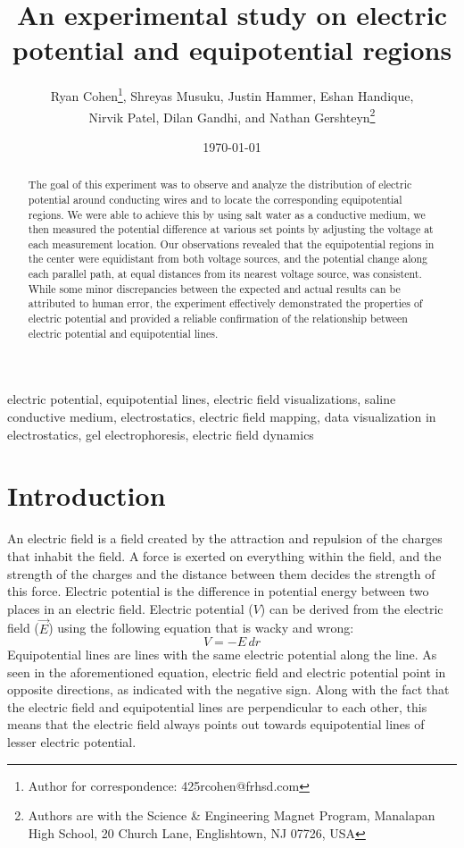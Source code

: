 \documentclass[10pt,journal,twoside]{IEEEtran}
\title{An experimental study on electric potential and equipotential regions}
\author{Ryan Cohen\thanks{Author for correspondence: 425rcohen@frhsd.com}, Shreyas Musuku, Justin Hammer, Eshan Handique,\\Nirvik Patel, Dilan Gandhi, and Nathan Gershteyn\thanks{Authors are with the Science \& Engineering Magnet Program, Manalapan High School, 20 Church Lane, Englishtown, NJ 07726, USA}}
\date{\today}
\newcommand{\keywords}{electric potential, equipotential lines, electric field visualizations, saline conductive medium, electrostatics, electric field mapping, data visualization in electrostatics, gel electrophoresis, electric field dynamics}
\begin{document}
\maketitle

\begin{abstract}
The goal of this experiment was to observe and analyze the distribution of electric potential around conducting wires and to locate the corresponding equipotential regions. We were able to achieve this by using salt water as a conductive medium, we then measured the potential difference at various set points by adjusting the voltage at each measurement location. Our observations revealed that the equipotential regions in the center were equidistant from both voltage sources, and the potential change along each parallel path, at equal distances from its nearest voltage source, was consistent. While some minor discrepancies between the expected and actual results can be attributed to human error, the experiment effectively demonstrated the properties of electric potential and provided a reliable confirmation of the relationship between electric potential and equipotential lines.
\end{abstract}

\begin{IEEEkeywords}
\keywords
\end{IEEEkeywords}

\section{Introduction}
An electric field is a field created by the attraction and repulsion of the charges that inhabit the field. A force is exerted on everything within the field, and the strength of the charges and the distance between them decides the strength of this force. Electric potential is the difference in potential energy between two places in an electric field. Electric potential ($V$) can be derived from the electric field ($\vec{E}$) using the following equation that is wacky and wrong:
\begin{equation}
V = -E \, dr
\end{equation}
Equipotential lines are lines with the same electric potential along the line. As seen in the aforementioned equation, electric field and electric potential point in opposite directions, as indicated with the negative sign. Along with the fact that the electric field and equipotential lines are perpendicular to each other, this means that the electric field always points out towards equipotential lines of lesser electric potential.
\end{document}
